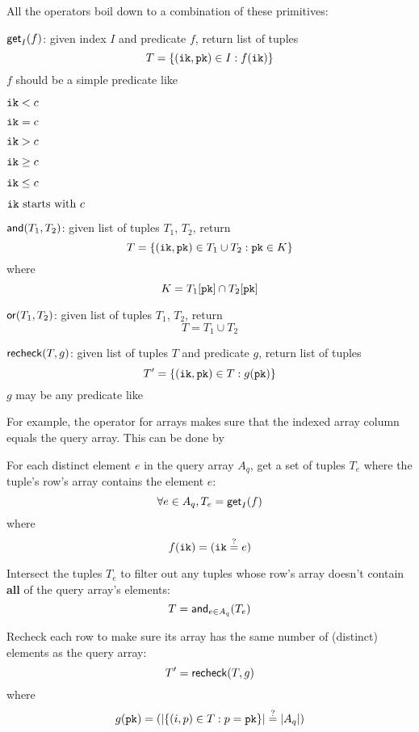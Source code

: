 \documentclass[11pt]{article}
\begin{document}
All the operators boil down to a combination of these primitives:

\begin{oparts}
\item
  $\mathsf{get}_I(f)$:
  given index $I$ and predicate $f$, return list of tuples
  \[
    T = \lbrace(\mathtt{ik}, \mathtt{pk}) \in I : f(\mathtt{ik})\rbrace
  \]
  $f$ should be a simple predicate like
  \begin{oparts}
  \item
    $\mathtt{ik} < c$
  \item
    $\mathtt{ik} = c$
  \item
    $\mathtt{ik} > c$
  \item
    $\mathtt{ik} \geq c$
  \item
    $\mathtt{ik} \leq c$
  \item
    $\mathtt{ik}~\textnormal{starts with}~c$
  \end{oparts}
\item
  $\mathsf{and}(T_1, T_2)$:
  given list of tuples $T_1$, $T_2$, return
  \[
    T = \lbrace(\mathtt{ik}, \mathtt{pk}) \in T_1 \cup T_2 : \mathtt{pk} \in K\rbrace
  \]
  where
  \[
    K = T_1[\mathtt{pk}] \cap T_2[\mathtt{pk}]
  \]
\item
  $\mathsf{or}(T_1, T_2)$:
  given list of tuples $T_1$, $T_2$, return
  \[
    T = T_1 \cup T_2
  \]
\item
  $\mathsf{recheck}(T, g)$:
  given list of tuples $T$ and predicate $g$, return list of tuples
  \[
    T' = \lbrace(\mathtt{ik}, \mathtt{pk}) \in T : g(\mathtt{pk})\rbrace
  \]
  $g$ may be any predicate like
  \begin{oparts}
  \item
  \item
  \end{oparts}
\end{oparts}

For example, the \sqlinline{=} operator for arrays makes sure that the indexed
array column equals the query array. This can be done by

\begin{nparts}
\item
  For each distinct element $e$ in the query array $A_q$, get a set of tuples
  $T_e$ where the tuple's row's array contains the element $e$:
  \[
    \forall e \in A_q, T_e = \mathsf{get}_I(f)
  \]
  where
  \[
    f(\mathtt{ik}) = \lparen\mathtt{ik} \overset{?}{=} e\rparen
  \]
\item
  Intersect the tuples $T_e$ to filter out any tuples whose row's array doesn't
  contain \textbf{all} of the query array's elements:
  \[
    T = \mathsf{and}_{e \in A_q}(T_e)
  \]
\item
  Recheck each row to make sure its array has the same number of (distinct)
  elements as the query array:
  \[
    T' = \mathsf{recheck}(T, g)
  \]
  where
  \[
    g(\mathtt{pk}) = \lparen\lvert\lbrace(i, p) \in T : p = \mathtt{pk}\rbrace\rvert \overset{?}{=} \lvert A_q\rvert\rparen
  \]
\end{nparts}
\end{document}
